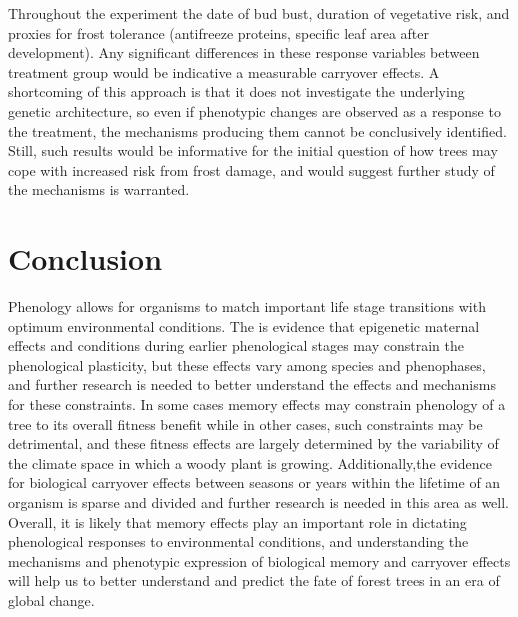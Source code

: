 \documentclass{article}\usepackage[]{graphicx}\usepackage[]{color}
\begin{document}
Throughout the experiment the date of bud bust, duration of vegetative risk, and proxies for frost tolerance (antifreeze proteins, specific leaf area after development). Any significant differences in these response variables between treatment group would be indicative a measurable carryover effects. A shortcoming of this approach is that it does not investigate the underlying genetic architecture, so even if phenotypic changes are observed as a response to the treatment, the mechanisms producing them cannot be conclusively identified. Still, such results would be informative for the initial question of how trees may cope with increased risk from frost damage, and would suggest further study of the mechanisms is warranted.
\section*{Conclusion}
\par Phenology allows for organisms to match important life stage transitions with optimum environmental conditions. The is evidence that epigenetic maternal effects and conditions during earlier phenological stages may constrain the phenological plasticity, but these effects vary among species and phenophases, and further research is needed to better understand the effects and mechanisms for these constraints. In some cases memory effects may constrain phenology of a tree to its overall fitness benefit while in other cases, such constraints may be detrimental, and these fitness effects are largely determined by the variability of the climate space in which a woody plant is growing. Additionally,the evidence for biological carryover effects between seasons or years within the lifetime of an organism is sparse and divided and further research is needed in this area as well. Overall, it is likely that memory effects play an important role in dictating phenological responses to environmental conditions, and understanding the mechanisms and phenotypic expression of biological memory and carryover effects will help us to better understand and predict the fate of forest trees in an era of global change. 










\end{document}
